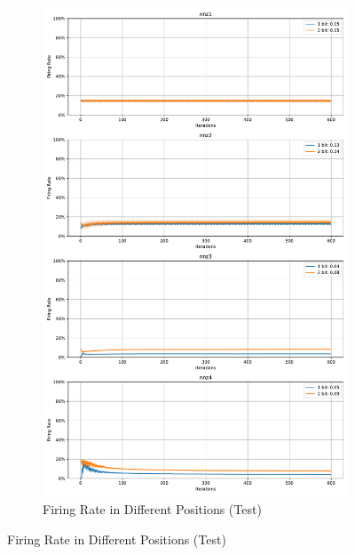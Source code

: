         \begin{figure}[H]
            \centering
            \ContinuedFloat
            \begin{subfigure}[H]{0.8\textwidth}
                \centering
                \includegraphics[width=\textwidth]{../firerate/DVSGesture/plots/dvsgesture_test_firerate.pdf}
                \caption{Firing Rate in Different Positions (Test)}
            \end{subfigure}
        \end{figure}
